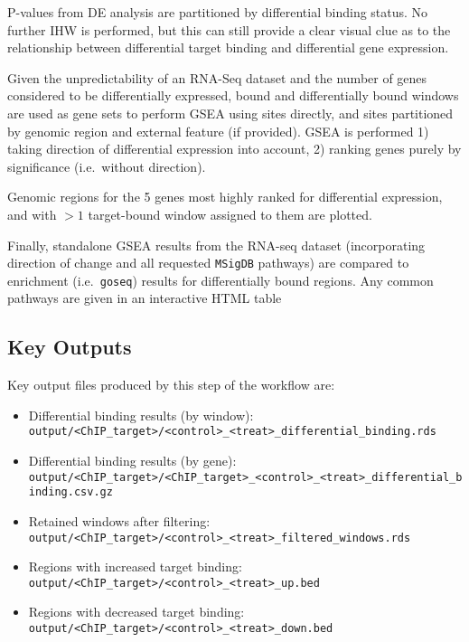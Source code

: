 \documentclass[
]{book}
\providecommand{\tightlist}{%
  \setlength{\itemsep}{0pt}\setlength{\parskip}{0pt}}
\begin{document}
P-values from DE analysis are partitioned by differential binding status.
No further IHW is performed, but this can still provide a clear visual clue as to the relationship between differential target binding and differential gene expression.

Given the unpredictability of an RNA-Seq dataset and the number of genes considered to be differentially expressed, bound and differentially bound windows are used as gene sets to perform GSEA\citep{fgsea} using sites directly, and sites partitioned by genomic region and external feature (if provided).
GSEA is performed 1) taking direction of differential expression into account, 2) ranking genes purely by significance (i.e.~without direction).

Genomic regions for the 5 genes most highly ranked for differential expression, and with \(>1\) target-bound window assigned to them are plotted.

Finally, standalone GSEA results from the RNA-seq dataset (incorporating direction of change and all requested \texttt{MSigDB} pathways) are compared to enrichment (i.e.~\texttt{goseq}) results for differentially bound regions.
Any common pathways are given in an interactive HTML table

\hypertarget{key-outputs-1}{%
\subsection*{Key Outputs}\label{key-outputs-1}}

Key output files produced by this step of the workflow are:

\begin{itemize}
\tightlist
\item
  Differential binding results (by window): \texttt{output/\textless{}ChIP\_target\textgreater{}/\textless{}control\textgreater{}\_\textless{}treat\textgreater{}\_differential\_binding.rds}
\item
  Differential binding results (by gene): \texttt{output/\textless{}ChIP\_target\textgreater{}/\textless{}ChIP\_target\textgreater{}\_\textless{}control\textgreater{}\_\textless{}treat\textgreater{}\_differential\_binding.csv.gz}
\item
  Retained windows after filtering: \texttt{output/\textless{}ChIP\_target\textgreater{}/\textless{}control\textgreater{}\_\textless{}treat\textgreater{}\_filtered\_windows.rds}
\item
  Regions with increased target binding: \texttt{output/\textless{}ChIP\_target\textgreater{}/\textless{}control\textgreater{}\_\textless{}treat\textgreater{}\_up.bed}
\item
  Regions with decreased target binding: \texttt{output/\textless{}ChIP\_target\textgreater{}/\textless{}control\textgreater{}\_\textless{}treat\textgreater{}\_down.bed}
\end{itemize}
\end{document}
